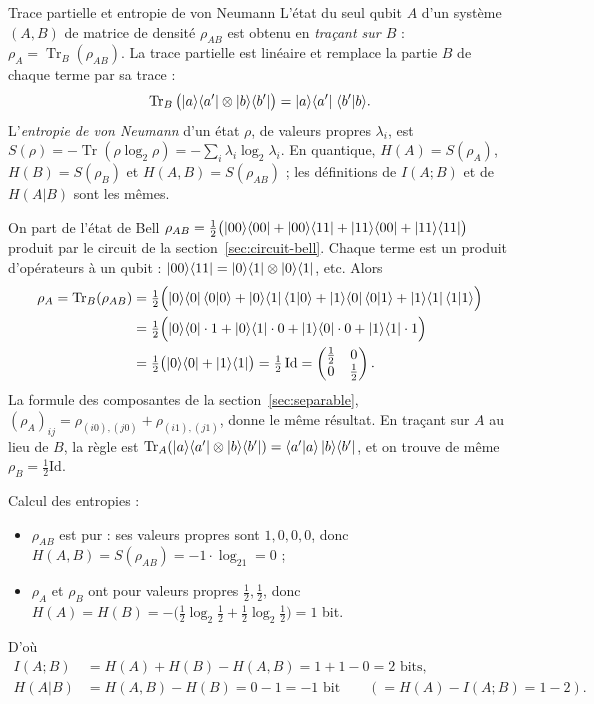 \begin{definition}{Trace partielle et entropie de von Neumann}
L'état du seul qubit $A$ d'un système $(A,B)$ de matrice de densité $\rho_{AB}$ est obtenu en
\emph{traçant sur $B$} : $\rho_A=\operatorname{Tr}_B(\rho_{AB})$. La trace partielle est
linéaire et remplace la partie $B$ de chaque terme par sa trace :
\[
  \operatorname{Tr}_B\big(|a\rangle\langle a'|\otimes|b\rangle\langle b'|\big)=|a\rangle\langle a'|\;\langle b'|b\rangle.
\]
L'\emph{entropie de von Neumann} d'un état $\rho$, de valeurs propres $\lambda_i$, est
$S(\rho)=-\operatorname{Tr}(\rho\log_2\rho)=-\sum_i\lambda_i\log_2\lambda_i$. En quantique,
$H(A)=S(\rho_A)$, $H(B)=S(\rho_B)$ et $H(A,B)=S(\rho_{AB})$ ; les définitions de
$I(A;B)$ et de $H(A|B)$ sont les mêmes.
\end{definition}

On part de l'état de Bell
$\rho_{AB}=\frac12\big(|00\rangle\langle 00|+|00\rangle\langle 11|+|11\rangle\langle 00|+|11\rangle\langle 11|\big)$
produit par le circuit de la section~\ref{sec:circuit-bell}. Chaque terme est un produit
d'opérateurs à un qubit :
$|00\rangle\langle 11|=|0\rangle\langle 1|\otimes|0\rangle\langle 1|$, etc. Alors
\begin{align*}
  \rho_A=\operatorname{Tr}_B(\rho_{AB})
  &=\tfrac12\Big(|0\rangle\langle 0|\,\langle 0|0\rangle+|0\rangle\langle 1|\,\langle 1|0\rangle
      +|1\rangle\langle 0|\,\langle 0|1\rangle+|1\rangle\langle 1|\,\langle 1|1\rangle\Big)\\
  &=\tfrac12\Big(|0\rangle\langle 0|\cdot1+|0\rangle\langle 1|\cdot0+|1\rangle\langle 0|\cdot0+|1\rangle\langle 1|\cdot1\Big)\\
  &=\tfrac12\big(|0\rangle\langle 0|+|1\rangle\langle 1|\big)=\tfrac12\,\mathrm{Id}
  =\begin{pmatrix}\frac12&0\\0&\frac12\end{pmatrix}.
\end{align*}
La formule des composantes de la section~\ref{sec:separable},
$(\rho_A)_{ij}=\rho_{(i0),(j0)}+\rho_{(i1),(j1)}$, donne le même résultat. En traçant sur $A$
au lieu de $B$, la règle est $\operatorname{Tr}_A(|a\rangle\langle a'|\otimes|b\rangle\langle b'|)
=\langle a'|a\rangle\,|b\rangle\langle b'|$, et on trouve de même $\rho_B=\frac12\mathrm{Id}$.

Calcul des entropies :
\begin{itemize}[nosep]
  \item $\rho_{AB}$ est pur : ses valeurs propres sont $1,0,0,0$, donc
        $H(A,B)=S(\rho_{AB})=-1\cdot\log_21=0$ ;
  \item $\rho_A$ et $\rho_B$ ont pour valeurs propres $\frac12,\frac12$, donc
        $H(A)=H(B)=-\big(\frac12\log_2\frac12+\frac12\log_2\frac12\big)=1$ bit.
\end{itemize}
D'où
\begin{align*}
  I(A;B)&=H(A)+H(B)-H(A,B)=1+1-0=2\text{ bits},\\
  H(A|B)&=H(A,B)-H(B)=0-1=-1\text{ bit}\qquad(=H(A)-I(A;B)=1-2).
\end{align*}

